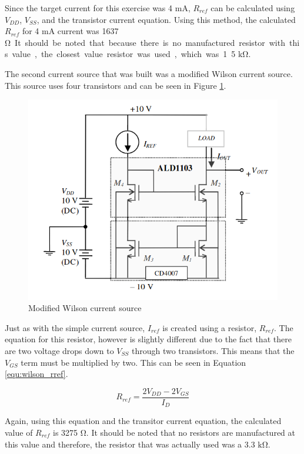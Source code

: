 \documentclass[11pt]{article}
\begin{document}
	Since the target current for this exercise was 4 $\si{\milli\ampere}$,
	$R_{ref}$ can be calculated using $V_{DD}$, $V_{SS}$, and the transistor 
	current equation. Using this method, the calculated $R_{ref}$ for 4 
	$\si{\milli\ampere}$ current was 1637 \si\ohm. It should be noted that 
	because there is no manufactured resistor with this value, the closest
	value resistor was used, which was 1.5 $\si{\kilo\ohm}$.\\

	\hfill \break

	The second current source that was built was a modified Wilson current
	source. This source uses four transistors and can be seen in Figure
	\ref{fig:mod_wilson}.

	\begin{figure}[H]
		\centering
		\includegraphics[width=4.0 in]{m_wilson_current.png}
		\caption{Modified Wilson current source}
		\label{fig:mod_wilson}
	\end{figure}

	Just as with the simple current source, $I_{ref}$ is created using a
	resistor, $R_{ref}$. The equation for this resistor, however is slightly
	different due to the fact that there are two voltage drops down to 
	$V_{SS}$ through two transistors. This means that the $V_{GS}$ term must
	be multiplied by two. This can be seen in Equation \ref{equ:wilson_rref}.

	\begin{equation}
		\label{equ:wilson_rref}
		R_{ref} = \frac{2V_{DD} - 2V_{GS}}{I_D}
	\end{equation}

	Again, using this equation and the transitor current equation, the calculated
	value of $R_{ref}$ is 3275 $\si\ohm$. It should be noted that no resistors are
	manufactured at this value and therefore, the resistor that was actually used
	was a 3.3 $\si{\kilo\ohm}$.\\
\end{document}
